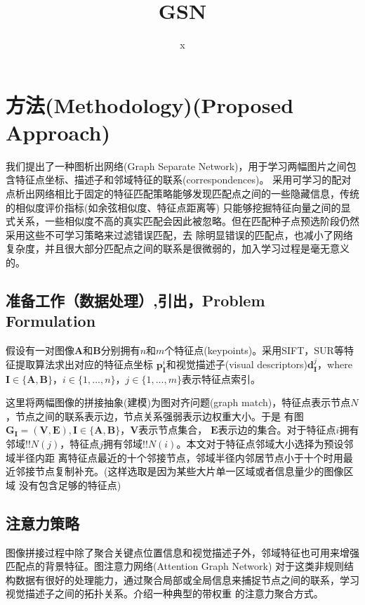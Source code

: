 \documentclass[10pt]{article}
\title{\textbf{GSN}}
\author{x}
\date{}
\begin{document}
\maketitle
\setcounter{page}{0}
\maketitle
\section{方法(Methodology)(Proposed Approach)}
我们提出了一种图析出网络(Graph Separate Network)，用于学习两幅图片之间包含特征点坐标、描述子和邻域特征的联系(correspondences)。
采用可学习的配对点析出网络相比于固定的特征匹配策略能够发现匹配点之间的一些隐藏信息，传统的相似度评价指标(如余弦相似度、特征点距离等)
只能够挖掘特征向量之间的显式关系，一些相似度不高的真实匹配会因此被忽略。但在匹配种子点预选阶段仍然采用这些不可学习策略来过滤错误匹配，去
除明显错误的匹配点，也减小了网络复杂度，并且很大部分匹配点之间的联系是很微弱的，加入学习过程是毫无意义的。 
\subsection{准备工作（数据处理）,引出，Problem Formulation}

假设有一对图像$\mathbf{A}$和$\mathbf{B}$分别拥有$n$和$m$个特征点(keypoints)。采用SIFT，SUR等特征提取算法求出对应的特征点坐标
$\mathbf{p}_{\mathbf{I}}^{i}$和视觉描述子(visual descriptors)$\mathbf{d}_{\mathbf{I}}^{j}$，where $\mathbf{I}\in 
\{\mathbf{A,B}\}$，$i\in\{1,...,n\}$，$j\in\{1,...,m\}$表示特征点索引。

这里将两幅图像的拼接抽象(建模)为图对齐问题(graph match)，特征点表示节点$N$，节点之间的联系表示边，节点关系强弱表示边权重大小。于是
有图$\mathbf{G}_{\mathbf{I}}=(\mathbf{V},\mathbf{E}),\mathbf{I}\in\{\mathbf{A},\mathbf{B}\}$，$\mathbf{V}$表示节点集合，
$\mathbf{E}$表示边的集合。对于特征点$i$拥有邻域!!$N(j)$，特征点$j$拥有邻域!!$N(i)$。本文对于特征点邻域大小选择为预设邻域半径内距
离特征点最近的十个邻接节点，邻域半径内邻居节点小于十个时用最近邻接节点复制补充。(这样选取是因为某些大片单一区域或者信息量少的图像区域
没有包含足够的特征点)

\subsection{注意力策略} 
图像拼接过程中除了聚合关键点位置信息和视觉描述子外，邻域特征也可用来增强匹配点的背景特征。图注意力网络(Attention Graph Network)
对于这类非规则结构数据有很好的处理能力，通过聚合局部或全局信息来捕捉节点之间的联系，学习视觉描述子之间的拓扑关系。介绍一种典型的带权重
的注意力聚合方式。\cite{Sattler2018}
\end{document}
